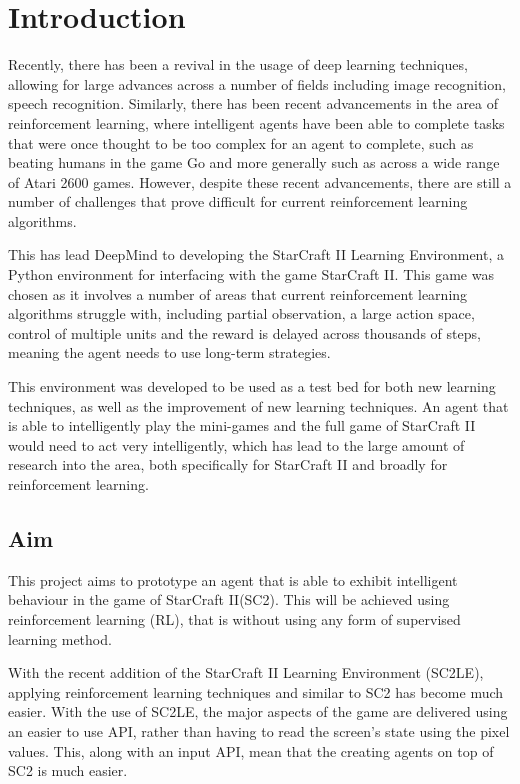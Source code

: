 \chapter{Introduction}%
\label{intro}

Recently, there has been a revival in the usage of deep
learning\cite{lecun2015deep} techniques, allowing for large advances across
a number of fields including image recognition\cite{krizhevsky2012imagenet},
speech recognition\cite{graves2013speech, hinton2012deep}. Similarly,
there has been recent advancements in the area of reinforcement learning,
where intelligent agents have been able to complete tasks that were once thought
to be too complex for an agent to complete, such as beating humans in the game
Go\cite{silver2016mastering} and more generally such as across a wide range of
Atari 2600 games\cite{mnih2015human}. However, despite these recent advancements,
there are still a number of challenges that prove difficult for current
reinforcement learning algorithms.

This has lead DeepMind\cite{deepmind} to developing the
StarCraft II Learning Environment\cite{vinyals2017starcraft}, a Python
environment for interfacing with the game StarCraft II\cite{pysc2, starcraft2}.
This game was chosen as it involves a number of areas that current reinforcement
learning algorithms struggle with, including partial observation, a large action
space, control of multiple units and the reward is delayed across thousands of
steps, meaning the agent needs to use long-term strategies.

This environment was developed to be used as a test bed for both new learning
techniques, as well as the improvement of new learning techniques. An agent
that is able to intelligently play the mini-games and the full game of
StarCraft II would need to act very intelligently, which has lead to the large
amount of research into the area, both specifically for StarCraft II and
broadly for reinforcement learning.

\section{Aim}

This project aims to prototype an agent that is able to exhibit intelligent
behaviour in the game of StarCraft II\@ (SC2). This will be achieved using
reinforcement learning (RL), that is without using any form of supervised
learning method.

With the recent addition of the StarCraft II Learning Environment (SC2LE),
applying reinforcement learning techniques and similar to SC2 has become
much easier. With the use of SC2LE, the major aspects of the game are
delivered using an easier to use API, rather than having to read the
screen's state using the pixel values. This, along with an input API,
mean that the creating agents on top of SC2 is much easier.

